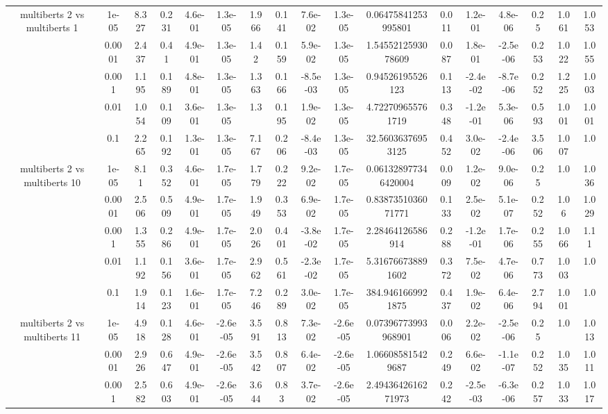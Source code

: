 \begin{tabular}{|c|c|c|c|c|c|c|c|c|c|c|c|c|c|c|c|c|}
\hline
\multirow{5}{*}{multiberts 2 vs multiberts 1} & 1e-05 & 8.327 & 0.231 & 4.6e-01 & 1.3e-05 & 1.966 & 0.141 & 7.6e-02 & 1.3e-05 & 0.06475841253995801 & 0.011 & 1.2e-01 & 4.8e-06 & 0.25 & 1.061 & 1.053 \\
 & 0.0001 & 2.437 & 0.41 & 4.9e-01 & 1.3e-05 & 1.42 & 0.159 & 5.9e-02 & 1.3e-05 & 1.5455212593078609 & 0.087 & 1.8e-01 & -2.5e-06 & 0.253 & 1.022 & 1.055 \\
 & 0.001 & 1.195 & 0.189 & 4.8e-01 & 1.3e-05 & 1.363 & 0.166 & -8.5e-03 & 1.3e-05 & 0.94526195526123 & 0.113 & -2.4e-02 & -8.7e-06 & 0.252 & 1.225 & 1.003 \\
 & 0.01 & 1.054 & 0.109 & 3.6e-01 & 1.3e-05 & 1.3 & 0.195 & 1.9e-02 & 1.3e-05 & 4.722709655761719 & 0.348 & -1.2e-01 & 5.3e-06 & 0.593 & 1.001 & 1.001 \\
 & 0.1 & 2.265 & 0.192 & 1.3e-01 & 1.3e-05 & 7.167 & 0.206 & -8.4e-03 & 1.3e-05 & 32.56036376953125 & 0.452 & 3.0e-02 & -2.4e-06 & 3.506 & 1.007 & 1.0 \\
\hline
\multirow{5}{*}{multiberts 2 vs multiberts 10} & 1e-05 & 8.11 & 0.352 & 4.6e-01 & 1.7e-05 & 1.779 & 0.222 & 9.2e-02 & 1.7e-05 & 0.061328977346420004 & 0.009 & 1.2e-02 & 9.0e-06 & 0.25 & 1.0 & 1.036 \\
 & 0.0001 & 2.506 & 0.509 & 4.9e-01 & 1.7e-05 & 1.949 & 0.353 & 6.9e-02 & 1.7e-05 & 0.8387351036071771 & 0.133 & 2.5e-02 & 5.1e-07 & 0.252 & 1.06 & 1.029 \\
 & 0.001 & 1.355 & 0.286 & 4.9e-01 & 1.7e-05 & 2.026 & 0.401 & -3.8e-02 & 1.7e-05 & 2.28464126586914 & 0.288 & -1.2e-01 & 1.7e-06 & 0.255 & 1.066 & 1.11 \\
 & 0.01 & 1.192 & 0.156 & 3.6e-01 & 1.7e-05 & 2.962 & 0.561 & -2.3e-02 & 1.7e-05 & 5.316766738891602 & 0.372 & 7.5e-02 & 4.7e-06 & 0.773 & 1.003 & 1.0 \\
 & 0.1 & 1.914 & 0.123 & 1.6e-01 & 1.7e-05 & 7.246 & 0.289 & 3.0e-02 & 1.7e-05 & 384.9461669921875 & 0.437 & 1.9e-02 & 6.4e-06 & 2.794 & 1.001 & 1.0 \\
\hline
\multirow{5}{*}{multiberts 2 vs multiberts 11} & 1e-05 & 4.918 & 0.128 & 4.6e-01 & -2.6e-05 & 3.591 & 0.813 & 7.3e-02 & -2.6e-05 & 0.07396773993968901 & 0.006 & 2.2e-02 & -2.5e-06 & 0.25 & 1.0 & 1.013 \\
 & 0.0001 & 2.926 & 0.647 & 4.9e-01 & -2.6e-05 & 3.542 & 0.807 & 6.4e-02 & -2.6e-05 & 1.066085815429687 & 0.249 & 6.6e-02 & -1.1e-07 & 0.252 & 1.035 & 1.011 \\
 & 0.001 & 2.582 & 0.603 & 4.9e-01 & -2.6e-05 & 3.644 & 0.83 & 3.7e-02 & -2.6e-05 & 2.4943642616271973 & 0.242 & -2.5e-03 & -6.3e-06 & 0.257 & 1.033 & 1.017 \\

\end{tabular}
